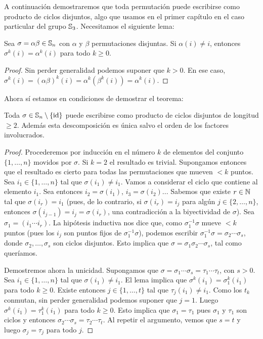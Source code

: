 A continuación demostraremos que toda permutación puede escribirse como producto de ciclos disjuntos, algo que usamos en el primer capítulo en el caso particular del grupo $\mathbb{S}_3$. Necesitamos el siguiente lema:

\begin{lemma}
	Sea $\sigma=\alpha\beta\in\mathbb{S}_n$ con $\alpha$ y $\beta$ permutaciones disjuntas. Si $\alpha(i)\ne i$, entonces $\sigma^k(i)=\alpha^k(i)$ para todo $k\geq0$.
\end{lemma}

\begin{proof}
	Sin perder generalidad podemos suponer que $k>0$. En ese caso, $\sigma^k(i)=(\alpha\beta)^k(i)=\alpha^k(\beta^k(i))=\alpha^k(i)$. 
\end{proof}

Ahora sí estamos en condiciones de demostrar el teorema: 

\begin{theorem}
Toda $\sigma\in\mathbb{S}_n\setminus\{\operatorname{id}\}$ puede escribirse como producto de ciclos disjuntos de longitud $\geq2$. Además esta descomposición es única salvo el orden de los factores involucrados.   	
\end{theorem}

\begin{proof}
	Procederemos por inducción en el número $k$ de elementos del conjunto $\{1,\dots,n\}$ movidos por $\sigma$. Si $k=2$ el resultado es trivial. Supongamos
	entonces que el resultado es cierto para todas las permutaciones que mueven $<k$ puntos. Sea $i_1\in\{1,\dots,n\}$ tal que $\sigma(i_1)\ne i_1$. Vamos a considerar el ciclo que contiene al elemento $i_1$. 
	Sea entonces
	$i_2=\sigma(i_1)$, $i_3=\sigma(i_2)$... Sabemos que existe $r\in\mathbb{N}$ tal que $\sigma(i_r)=i_1$ (pues, de lo contrario, si $\sigma(i_r)=i_j$ para algún 
	$j\in\{2,\dots,n\}$, entonces $\sigma(i_{j-1})=i_j=\sigma(i_r)$, una contradicción a la biyectividad de $\sigma$). Sea $\sigma_1=(i_1\cdots i_r)$. La hipótesis
	inductiva nos dice que, como $\sigma_1^{-1}\sigma$ mueve $<k$ puntos (pues los $i_j$ son puntos fijos de $\sigma_1^{-1}\sigma$), podemos escribir $\sigma_1^{-1}\sigma=\sigma_2\cdots\sigma_s$, donde
	$\sigma_2,\dots,\sigma_s$ son ciclos disjuntos. Esto implica que $\sigma=\sigma_1\sigma_2\cdots\sigma_s$, tal como queríamos. 
	
	Demostremos ahora la unicidad. Supongamos que $\sigma=\sigma_1\cdots\sigma_s=\tau_1\cdots\tau_t$, con $s>0$. Sea $i_1\in\{1,\dots,n\}$ tal que
	$\sigma(i_1)\ne i_1$. El lema implica que $\sigma^k(i_1)=\sigma_1^k(i_1)$ para todo $k\geq0$. Existe entonces $j\in\{1,\dots,t\}$ tal que 
	$\tau_j(i_1)\ne i_1$. Como los $t_k$ conmutan, sin perder generalidad podemos suponer que $j=1$. Luego $\sigma^k(i_1)=\tau_1^k(i_1)$ para todo $k\geq0$.  Esto implica que
	$\sigma_1=\tau_1$ pues $\sigma_1$ y $\tau_1$ son ciclos y entonces $\sigma_2\cdots\sigma_s=\tau_2\cdots\tau_t$. Al repetir el argumento, vemos que $s=t$ y luego $\sigma_j=\tau_j$ para todo $j$.   
\end{proof}

